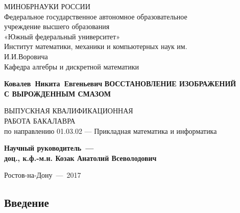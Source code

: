 \documentclass[a4paper]{article}
\renewcommand{\normalsize}{\fontsize{14}{16pt}\selectfont}
\renewcommand{\large}{\fontsize{17}{20pt}\selectfont}
\theoremstyle{definition}
\begin{document}
\normalsize

    \thispagestyle{empty}
    \begin{titlepage}
    \begin{center}


    \vfill
    МИНОБРНАУКИ РОССИИ\\
    \vspace*{0.3cm}
    Федеральное государственное автономное образовательное\\
    учреждение высшего образования\\
    «Южный федеральный университет»\\
    \vspace*{0.3cm}
    Институт математики, механики и компьютерных наук им.\\
    И.И.Воровича\\
    Кафедра алгебры и дискретной математики
    \vfill


    \bigskip


    {\large\bf Ковалев~Никита~Евгеньевич}
    \vfill
    {\large\bf ВОССТАНОВЛЕНИЕ ИЗОБРАЖЕНИЙ\\
               С ВЫРОЖДЕННЫМ СМАЗОМ}

\fontsize{14}{16pt}\selectfont

    \vfill
    ВЫПУСКНАЯ КВАЛИФИКАЦИОННАЯ\\ РАБОТА БАКАЛАВРА\\
    по направлению 01.03.02 — Прикладная математика и информатика
    \vfill

    {\bf Научный руководитель~---\\
         доц., к.ф.-м.н. Козак Анатолий Всеволодович}



    \vfill

    \end{center}

    \bigskip

    \begin{center}
        Ростов-на-Дону~---~2017
    \end{center}

    \end{titlepage}

    \tableofcontents
    \newpage

    \begin{center}
        \section*{Введение}
    \end{center}
\end{document}
